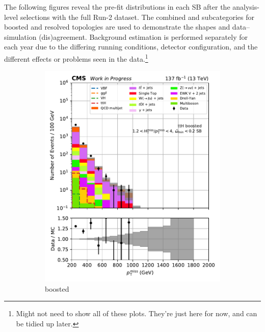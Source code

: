 The following figures reveal the pre-fit \ptmiss distributions in each \gls{SB} after the analysis-level selections with the full Run-2 dataset. The combined \ttH and \VH subcategories for boosted and resolved topologies are used to demonstrate the shapes and data--simulation (dis)agreement. Background estimation is performed separately for each year due to the differing running conditions, detector configuration, and the different effects or problems seen in the data.\footnote{Might not need to show all of these plots. They're just here for now, and can be tidied up later.}

\begin{figure}[htbp]
    \centering
    \begin{subfigure}[b]{0.24\textwidth}
        \includegraphics[width=\textwidth]{figures/region_plots/2016to18/sideband_0/ttH_boosted.pdf}
        \caption{\ttH boosted}
    \end{subfigure}
    \hfill
    \begin{subfigure}[b]{0.24\textwidth}

\end{subfigure}
\end{figure}
